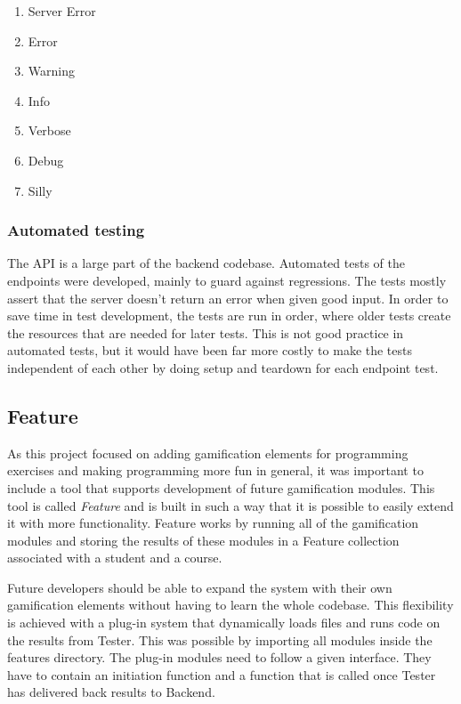 \begin{enumerate}
  \item Server Error
  \item Error
  \item Warning
  \item Info
  \item Verbose
  \item Debug
  \item Silly
\end{enumerate}

\subsubsection{Automated testing}
The API is a large part of the backend codebase. Automated tests of the endpoints were developed, mainly to guard against regressions. The tests mostly assert that the server doesn't return an error when given good input. In order to save time in test development, the tests are run in order, where older tests create the resources that are needed for later tests. This is not good practice in automated tests, but it would have been far more costly to make the tests independent of each other by doing setup and teardown for each endpoint test.

\subsection{Feature}

As this project focused on adding gamification elements for programming exercises and making programming more fun in general, it was important to include a tool that supports development of future gamification modules. This tool is called \emph{Feature} and is built in such a way that it is possible to easily extend it with more functionality. Feature works by running all of the gamification modules and storing the results of these modules in a Feature collection associated with a student and a course.

Future developers should be able to expand the system with their own gamification elements without having to learn the whole codebase. This flexibility is achieved with a plug-in system that dynamically loads files and runs code on the results from Tester. This was possible by importing all modules inside the features directory. The plug-in modules need to follow a given interface. They have to contain an initiation function and a function that is called once Tester has delivered back results to Backend. 

